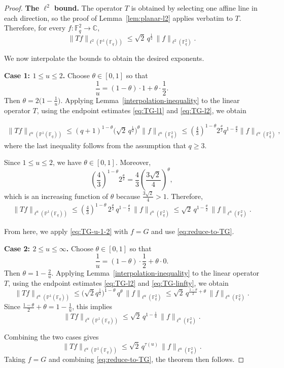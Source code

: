 \documentclass[10pt,a4paper]{amsart}
\begin{document}
\begin{proof}
\medskip
\noindent\textbf{The $\ell^2$ bound.}
The operator $T$ is obtained by selecting one affine line in each direction,
so the proof of Lemma~\ref{lem:planar-l2} applies verbatim to $T$.
Therefore, for every $f:\mathbb{F}_q^2\to\mathbb{C}$,
\begin{equation}\label{eq:TG-l2}
\|T f\|_{\ell^2(\mathbb{P}^1(\mathbb{F}_q))}
\le
\sqrt{2}\,q^{\frac12}\,\|f\|_{\ell^2(\mathbb{F}_q^2)}.
\end{equation}

We now interpolate the bounds to obtain the desired exponents.

\medskip
\noindent\textbf{Case 1: $1\le u\le 2$.}
Choose $\theta\in[0,1]$ so that
\[
\frac1u=(1-\theta)\cdot 1+\theta\cdot\frac12.
\]
Then $\theta=2\bigl(1-\frac1u\bigr)$.
Applying Lemma~\ref{interpolation-inequality} to the linear operator $T$,
using the endpoint estimates \eqref{eq:TG-l1} and \eqref{eq:TG-l2}, we obtain
{ 
\begin{align*}
\|Tf\|_{\ell^u(\mathbb{P}^1(\mathbb{F}_q))}
\le
(q+1)^{1-\theta}\bigl(\sqrt{2}\,q^{\frac12}\bigr)^{\theta}
\|f\|_{\ell^u(\mathbb{F}_q^2)} 
\le
\left(\frac43\right)^{1-\theta}
2^{\frac{\theta}{2}}
q^{1-\frac{\theta}{2}}
\|f\|_{\ell^u(\mathbb{F}_q^2)},
\end{align*}
where the last inequality follows from the assumption that $q\ge 3$.

Since $1\le u\le2$, we have $\theta\in[0,1]$. Moreover,
\[
\left(\frac43\right)^{1-\theta}2^{\frac{\theta}{2}}
=
\frac43\left(\frac{3\sqrt2}{4}\right)^\theta,
\]
which is an increasing function of $\theta$ because $\frac{3\sqrt2}{4}>1$.
Therefore,
\begin{align}
\label{eq:TG-u-1-2}
\|Tf\|_{\ell^u(\mathbb{P}^1(\mathbb{F}_q))}
\le
\left(\frac43\right)^{1-\theta} \, 
2^{\frac{\theta}{2}} \, 
q^{1-\frac{\theta}{2}} \, 
\|f\|_{\ell^u(\mathbb{F}_q^2)}
\le
\sqrt{2}\,
q^{1-\frac{\theta}{2}} \, 
\|f\|_{\ell^u(\mathbb{F}_q^2)}.
\end{align}
}
From here, we apply \eqref{eq:TG-u-1-2} with $f=G$ and use \eqref{eq:reduce-to-TG}.



\medskip
\noindent\textbf{Case 2: $2\le u\le \infty$.}
Choose $\theta\in[0,1]$ so that
\[
\frac1u=(1-\theta)\cdot\frac12+\theta\cdot 0.
\]
Then $\theta=1-\frac{2}{u}$.
Applying Lemma~\ref{interpolation-inequality} to the linear operator $T$,
using the endpoint estimates \eqref{eq:TG-l2} and \eqref{eq:TG-linfty}, we obtain 
\[
\|T f\|_{\ell^u(\mathbb{P}^1(\mathbb{F}_q))}
\le
\bigl(\sqrt{2}q^{\frac12}\bigr)^{1-\theta}\,q^{\theta}\,
\|f\|_{\ell^u(\mathbb{F}_q^2)}
\leq \sqrt{2}
\,q^{\frac{1-\theta}{2}+\theta}\,\|f\|_{\ell^u(\mathbb{F}_q^2)}.
\]
Since $\frac{1-\theta}{2}+\theta=1-\frac1u$, this implies
\[
\|T f\|_{\ell^u(\mathbb{P}^1(\mathbb{F}_q))}
\le \sqrt{2} \,q^{1-\frac1u}\,\|f\|_{\ell^u(\mathbb{F}_q^2)}.
\]

Combining the two cases gives
\[
\|T f\|_{\ell^u(\mathbb{P}^1(\mathbb{F}_q))}
\le \sqrt{2}  \,q^{\tau(u)}\,\|f\|_{\ell^u(\mathbb{F}_q^2)}.
\]
Taking $f=G$ and combining \eqref{eq:reduce-to-TG}, the theorem then follows.
\end{proof}
\end{document}
